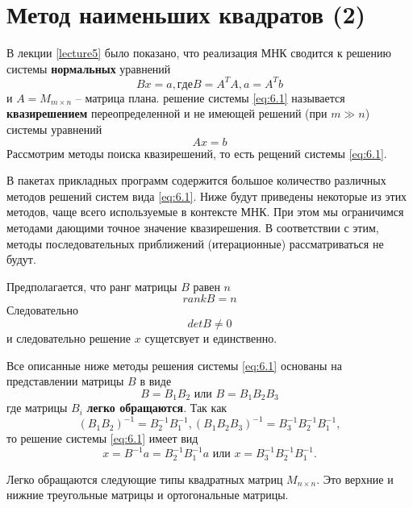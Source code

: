 \section{Метод наименьших квадратов (2)}
\label{lecture6}

В лекции \ref{lecture5} было показано, что реализация МНК сводится к решению системы \textbf{нормальных} уравнений 
\begin{equation} \label{eq:6.1}
	Bx = a, где B = A^TA, a = A^Tb
\end{equation}
и $A=M_{m \times n}$  -- матрица плана. решение системы \ref{eq:6.1} называется \textbf{квазирешением} переопределенной и не имеющей решений (при $m\gg n$) системы уравнений 
\begin{equation}
	Ax = b
\end{equation}
Рассмотрим методы поиска квазирешений, то есть рещений системы \ref{eq:6.1}. 

В пакетах прикладных программ содержится большое количество различных методов решений систем вида \ref{eq:6.1}. Ниже будут приведены некоторые из этих методов, чаще всего используемые в контексте МНК. При этом мы ограничимся методами дающими точное значение квазирешения. В соответствии с этим, методы последовательных приближений (итерационные) рассматриваться не будут.

Предполагается, что ранг матрицы $B$ равен $n$
\begin{equation} 
	rank B = n
\end{equation}
Следовательно
\begin{equation}
	det B \neq 0
\end{equation}
и следовательно решение $x$ сущетсвует и единственно.

Все описанные ниже методы решения системы \ref{eq:6.1} основаны на представлении матрицы $B$ в виде
\begin{equation} 
	B = B_1 B_2 \text{ или } B = B_1 B_2 B_3
\end{equation}
где матрицы $B_i$ \textbf{легко обращаются}.
Так как
\begin{equation} 
	(B_1B_2)^{-1} = B_2^{-1} B_1^{-1}, (B_1B_2B_3)^{-1} = B_3^{-1}B_2^{-1} B_1^{-1},
\end{equation}
то решение системы \ref{eq:6.1} имеет вид
\begin{equation}
	x = B^{-1} a = B_2^{-1} B_1^{-1} a \text{ или } x = B_3^{-1}B_2^{-1} B_1^{-1}.
\end{equation}

Легко обращаются следующие типы квадратных матриц $M_{n \times n}$. Это верхние и нижние треугольные матрицы и ортогональные матрицы.

